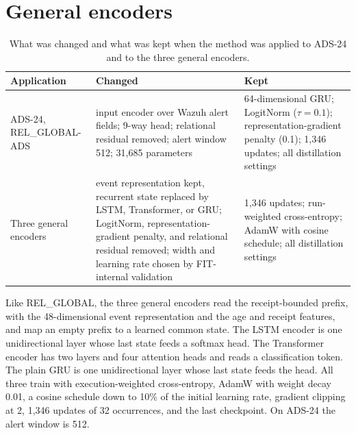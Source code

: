 \section{General encoders}
\label{sec:repro-encoders}

\begin{table}[htbp]
\centering
\caption[Changes for ADS-24 and for the three general encoders]{What was changed and what was kept when the method was applied to
ADS-24 and to the three general encoders.}
\label{tab:transfer}
\small
\begin{tabularx}{\textwidth}{@{}lXX@{}}
\toprule
Application & Changed & Kept \\
\midrule
ADS-24, REL\_GLOBAL-ADS
  & input encoder over Wazuh alert fields; 9-way head; relational residual
    removed; alert window 512; 31,685 parameters
  & 64-dimensional GRU; LogitNorm ($\tau=0.1$); representation-gradient
    penalty (0.1); 1,346 updates; all distillation settings \\
Three general encoders
  & event representation kept, recurrent state replaced by LSTM, Transformer, or GRU; LogitNorm,
    representation-gradient penalty, and relational residual removed; width and learning
    rate chosen by FIT-internal validation
  & 1,346 updates; run-weighted cross-entropy; AdamW with cosine schedule;
    all distillation settings \\
\bottomrule
\end{tabularx}
\end{table}


Like REL\_GLOBAL, the three general encoders read the receipt-bounded
prefix, with the 48-dimensional event representation and the age
and receipt features, and map an empty prefix to a learned common
state. The LSTM encoder is one unidirectional layer whose last state
feeds a softmax head. The Transformer encoder has two layers and four
attention heads and reads a classification token. The plain GRU is one
unidirectional layer whose last state feeds the head. All three train
with execution-weighted cross-entropy, AdamW with weight decay 0.01, a
cosine schedule down to 10\% of the initial learning rate, gradient
clipping at 2, 1,346 updates of 32 occurrences, and the last
checkpoint. On ADS-24 the alert window is 512.

